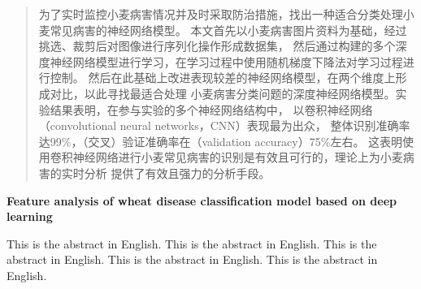 \begin{abstract}
    为了实时监控小麦病害情况并及时采取防治措施，找出一种适合分类处理小麦常见病害的神经网络模型。
    本文首先以小麦病害图片资料为基础，经过挑选、裁剪后对图像进行序列化操作形成数据集，
    然后通过构建的多个深度神经网络模型进行学习，在学习过程中使用随机梯度下降法对学习过程进行控制。
    然后在此基础上改进表现较差的神经网络模型，在两个维度上形成对比，以此寻找最适合处理
    小麦病害分类问题的深度神经网络模型。实验结果表明，在参与实验的多个神经网络结构中，
    以卷积神经网络（convolutional neural networks，CNN）表现最为出众，
    整体识别准确率达99\%，（交叉）验证准确率在（validation accuracy）75\%左右。
    这表明使用卷积神经网络进行小麦常见病害的识别是有效且可行的，理论上为小麦病害的实时分析
    提供了有效且强力的分析手段。

\end{abstract}
\newpage

\begin{center}
    \fontsize{18pt}{18pt}\textbf{Feature analysis of wheat disease classification model based on deep learning}
\end{center}
\begin{enabstract}
    This is the abstract in English.    This is the abstract in English.    This is the abstract in English.    This is the abstract in English.    This is the abstract in English.

\end{enabstract}
\newpage